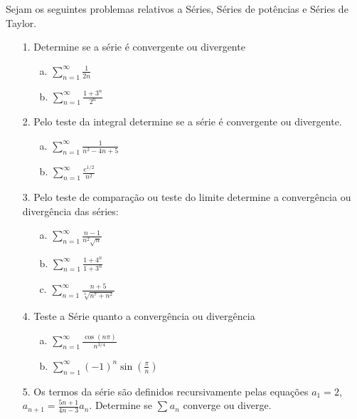 Sejam os seguintes problemas relativos a Séries, Séries de potências e Séries de Taylor.


\begin{itemize}
	\item[1.] Determine se a série é convergente ou divergente 
	\begin{itemize}
	\item[a.] $\sum_{n=1}^{\infty}\frac{1}{2n}$
	\item[b.] $\sum_{n=1}^{\infty}\frac{1+3^{n}}{2^{n}}$
    \end{itemize}	
\end{itemize}
\begin{itemize}
	\item[2.] Pelo teste da integral determine se a série é convergente ou divergente.   
	\begin{itemize}
		\item[a.] $\sum_{n=1}^{\infty}\frac{1}{n^{2}-4n+5}$
		\item[b.] $\sum_{n=1}^{\infty}\frac{e^{1/2}}{n^{2}}$
	\end{itemize}
\end{itemize}
\begin{itemize}
	\item [3.] Pelo teste de comparação ou teste do limite determine a convergência ou divergência das séries: 
	\begin{itemize}
		\item[a.] $\sum_{n=1}^{\infty}\frac{n-1}{n^{2}\sqrt{n}}$
		\item[b.] $\sum_{n=1}^{\infty}\frac{1+4^{n}}{1+3^{n}}$
		\item[c.] $\sum_{n=1}^{\infty}\frac{n+5}{\sqrt[3]{n^{7}+n^{2}}}$
	\end{itemize}
		
\end{itemize}
\begin{itemize}
	\item[4.] Teste a Série quanto a convergência ou divergência
	\begin{itemize}
	\item[a.] $\sum_{n=1}^{\infty}\frac{\cos (n\pi)}{n^{3/4}}$
	\item[b.] $\sum_{n=1}^{\infty}(-1)^{n}\sin (\frac{\pi}{n})$
    \end{itemize}
\end{itemize}
\begin{itemize}
	\item[5.] Os termos da série são definidos recursivamente pelas equações $a_{1}=2$, $a_{n+1}=\frac{5n+1}{4n-3}a_{n}$. Determine se $\sum_{}^{} a_{n}$ converge ou diverge.
\end{itemize}

